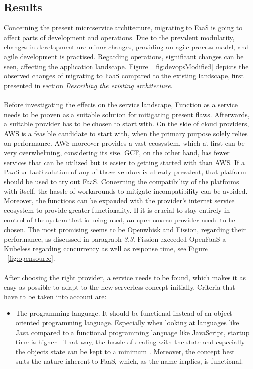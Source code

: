 \documentclass[a4paper,11pt, pagesize]{scrartcl}
\begin{document}
\begin{spacing}{1.2}
\subsection{Results}
Concerning the present microservice architecture, migrating to FaaS is going to affect parts of development and operations. Due to the prevalent modularity, changes in development are minor changes, providing an agile process model, and agile development is practised. Regarding operations, significant changes can be seen, affecting the application landscape. Figure ~\ref{fig:devopsModified} depicts the observed changes of migrating to FaaS compared to the existing landscape, first presented in section \textit{Describing the existing architecture}.\\\\ Before investigating the effects on the service landscape, Function as a service needs to be proven as a suitable solution for mitigating present flaws. Afterwards, a suitable provider has to be chosen to start with. On the side of cloud providers, AWS is a feasible candidate to start with, when the primary purpose solely relies on performance. AWS moreover provides a vast ecosystem, which at first can be very overwhelming, considering its size. GCF, on the other hand, has fewer services that can be utilized but is easier to getting started with than AWS. If a PaaS or IaaS solution of any of those vendors is already prevalent, that platform should be used to try out FaaS. Concerning the compatibility of the platforms with itself, the hassle of workarounds to mitigate incompatibility can be avoided. Moreover, the functions can be expanded with the provider's internet service ecosystem to provide greater functionality. If it is crucial to stay entirely in control of the system that is being used, an open-source provider needs to be chosen. The most promising seems to be Openwhisk and Fission, regarding their performance, as discussed in paragraph \textit{3.3}. Fission exceeded OpenFaaS a Kubeless regarding concurrency as well as response time, see Figure ~\ref{fig:opensource}.\\\\ After choosing the right provider, a service needs to be found, which makes it as easy as possible to adapt to the new serverless concept initially. Criteria that have to be taken into account are:
\begin{itemize}
  \item[1.] The programming language. It should be functional instead of an object-oriented programming language. Especially when looking at languages like Java compared to a functional programming language like JavaScript, startup time is higher \cite{manner2018cold}. That way, the hassle of dealing with the state and especially the objects state can be kept to a minimum \cite{bardsley2018serverless}. Moreover, the concept best suits the nature inherent to FaaS, which, as the name implies, is functional.

\end{itemize}
\end{spacing}
\end{document}
